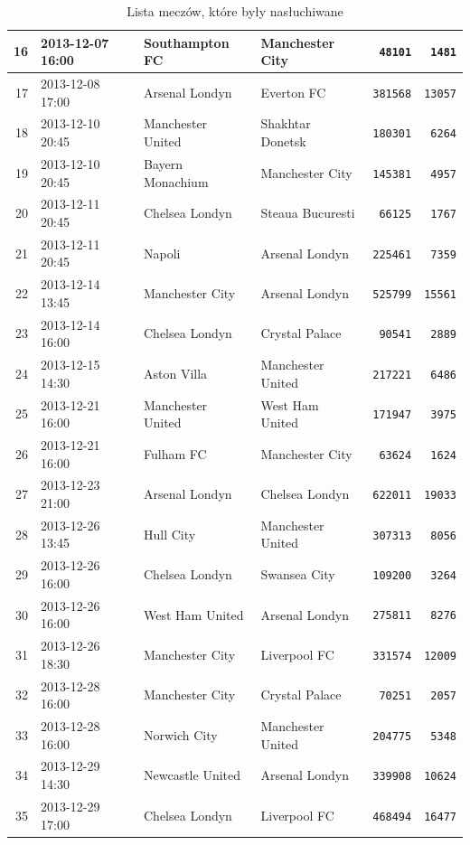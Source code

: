 \begin{table}[ht!]
\begin{center}
\begin{tabular}{|r|l|l|l|r|r|}
16 & 2013-12-07 16:00 & Southampton FC & Manchester City & \texttt{48101} & \texttt{1481}	\\ \hline
17 & 2013-12-08 17:00 & Arsenal Londyn & Everton FC & \texttt{381568} & \texttt{13057}	\\ \hline
18 & 2013-12-10 20:45 & Manchester United & Shakhtar Donetsk & \texttt{180301} & \texttt{6264}	\\ \hline
19 & 2013-12-10 20:45 & Bayern Monachium & Manchester City & \texttt{145381} & \texttt{4957}	\\ \hline
20 & 2013-12-11 20:45 & Chelsea Londyn & Steaua Bucuresti & \texttt{66125} & \texttt{1767}	\\ \hline
21 & 2013-12-11 20:45 & Napoli & Arsenal Londyn & \texttt{225461} & \texttt{7359}	\\ \hline
22 & 2013-12-14 13:45 & Manchester City & Arsenal Londyn & \texttt{525799} & \texttt{15561}	\\ \hline
23 & 2013-12-14 16:00 & Chelsea Londyn & Crystal Palace & \texttt{90541} & \texttt{2889}	\\ \hline
24 & 2013-12-15 14:30 & Aston Villa & Manchester United & \texttt{217221} & \texttt{6486}	\\ \hline
25 & 2013-12-21 16:00 & Manchester United & West Ham United & \texttt{171947} & \texttt{3975}	\\ \hline
26 & 2013-12-21 16:00 & Fulham FC & Manchester City & \texttt{63624} & \texttt{1624}	\\ \hline
27 & 2013-12-23 21:00 & Arsenal Londyn & Chelsea Londyn & \texttt{622011} & \texttt{19033}	\\ \hline
28 & 2013-12-26 13:45 & Hull City & Manchester United & \texttt{307313} & \texttt{8056}	\\ \hline
29 & 2013-12-26 16:00 & Chelsea Londyn & Swansea City & \texttt{109200} & \texttt{3264}	\\ \hline
30 & 2013-12-26 16:00 & West Ham United & Arsenal Londyn & \texttt{275811} & \texttt{8276}	\\ \hline
31 & 2013-12-26 18:30 & Manchester City & Liverpool FC & \texttt{331574} & \texttt{12009}	\\ \hline
32 & 2013-12-28 16:00 & Manchester City & Crystal Palace & \texttt{70251} & \texttt{2057}	\\ \hline
33 & 2013-12-28 16:00 & Norwich City & Manchester United & \texttt{204775} & \texttt{5348}	\\ \hline
34 & 2013-12-29 14:30 & Newcastle United & Arsenal Londyn & \texttt{339908} & \texttt{10624}	\\ \hline
35 & 2013-12-29 17:00 & Chelsea Londyn & Liverpool FC & \texttt{468494} & \texttt{16477}	\\ \hline
\end{tabular} 
\end{center} 
\caption{Lista meczów, które były nasłuchiwane}
\label{table:listameczow}
\end{table}

